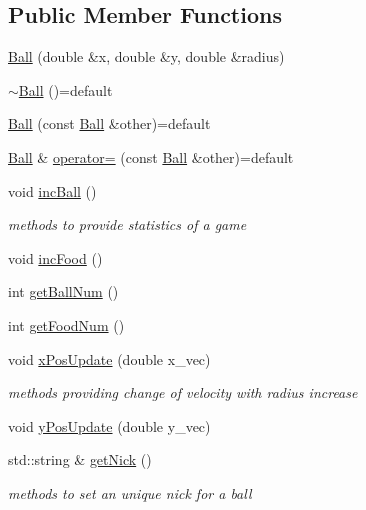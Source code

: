 \subsection*{Public Member Functions}
\begin{DoxyCompactItemize}
\item 
\hyperlink{classwebsocket_1_1Ball_a1d933b1f878ee0bcd00e2db1b10c44c2}{Ball} (double \&x, double \&y, double \&radius)
\item 
\hyperlink{classwebsocket_1_1Ball_abf56827e2e9042b2b0eaa71fed17b725}{$\sim$\+Ball} ()=default
\item 
\hyperlink{classwebsocket_1_1Ball_a0b3751d6c313f7bda53eb409196f7c9d}{Ball} (const \hyperlink{classwebsocket_1_1Ball}{Ball} \&other)=default
\item 
\hyperlink{classwebsocket_1_1Ball}{Ball} \& \hyperlink{classwebsocket_1_1Ball_abd82c6929644366316b7ea7b0c14e186}{operator=} (const \hyperlink{classwebsocket_1_1Ball}{Ball} \&other)=default
\item 
void \hyperlink{classwebsocket_1_1Ball_a56d1cbb94bec861ab3fa4504529bf02c}{inc\+Ball} ()
\begin{DoxyCompactList}\small\item\em methods to provide statistics of a game \end{DoxyCompactList}\item 
void \hyperlink{classwebsocket_1_1Ball_ab6f803423e713615a2c5459d8ca46a18}{inc\+Food} ()
\item 
int \hyperlink{classwebsocket_1_1Ball_a411b524d3d20241529f6dcf3ccd2da43}{get\+Ball\+Num} ()
\item 
int \hyperlink{classwebsocket_1_1Ball_a060bc9bd4aa8b138ee0d396a2c496d0c}{get\+Food\+Num} ()
\item 
void \hyperlink{classwebsocket_1_1Ball_a2ebc2a00fefeb3f2e355511cffa4aef8}{x\+Pos\+Update} (double x\+\_\+vec)
\begin{DoxyCompactList}\small\item\em methods providing change of velocity with radius increase \end{DoxyCompactList}\item 
void \hyperlink{classwebsocket_1_1Ball_a1f1dce628d5b5b5b06a93beb9bb8cca4}{y\+Pos\+Update} (double y\+\_\+vec)
\item 
std\+::string \& \hyperlink{classwebsocket_1_1Ball_a6dc2ee8009c03f1fa8913a316660e95f}{get\+Nick} ()
\begin{DoxyCompactList}\small\item\em methods to set an unique nick for a ball \end{DoxyCompactList}\item 

\end{DoxyCompactItemize}
